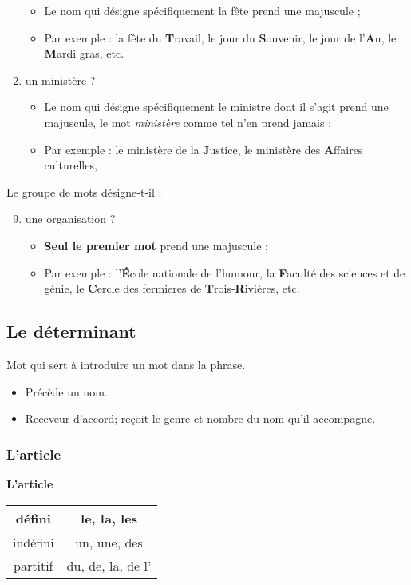 \documentclass[10pt, french]{article}
\begin{document}
\begin{multicols*}{2}
\begin{enumerate}
		\begin{itemize}
		\item	Le nom qui désigne spécifiquement la fête prend une majuscule ;
		\item	Par exemple : la fête du \textbf{T}ravail, le jour du \textbf{S}ouvenir, le jour de l'\textbf{A}n, le \textbf{M}ardi gras, etc.
		\end{itemize}
	\item	un ministère ?
		\begin{itemize}
		\item	Le nom qui désigne spécifiquement le ministre dont il s'agit prend une majuscule, le mot \textit{ministère} comme tel n'en prend jamais ;
		\item	Par exemple : le ministère de la \textbf{J}ustice, le ministère des \textbf{A}ffaires culturelles, 
		\end{itemize}
\end{enumerate}

Le groupe de mots désigne-t-il :
\begin{enumerate}
	\setcounter{enumi}{8}
	\item	une organisation ?
		\begin{itemize}
		\item	\textbf{Seul le premier mot} prend une majuscule ;
		\item	Par exemple : l'\textbf{É}cole nationale de l'humour, la \textbf{F}aculté des sciences et de génie, le \textbf{C}ercle des fermieres de \textbf{T}rois-\textbf{R}ivières, etc.
		\end{itemize}
\end{enumerate}


\columnbreak
\subsection{Le déterminant}\label{sec:classes-det}
\begin{definitionNOHFILL}[Le déterminant]
Mot qui sert à introduire un mot dans la phrase.\\

\begin{itemize}
	\item	Précède un nom.
	\item	Receveur d'accord; reçoit le genre et nombre du nom qu'il accompagne.
\end{itemize}
\end{definitionNOHFILL}


\subsubsection{L'article}
\textbf{L'article}
\begin{center}
\begin{tabular}{| >{\columncolor{airforceblue}}c | >{\columncolor{beaublue}}c  |}
\hline
défini	&	le, la, les	\\\hline
indéfini	&	un, une, des	\\\hline
partitif	&	du, de, la, de l'\\\hline
\end{tabular}
\end{center}


\end{multicols*}
\end{document}
